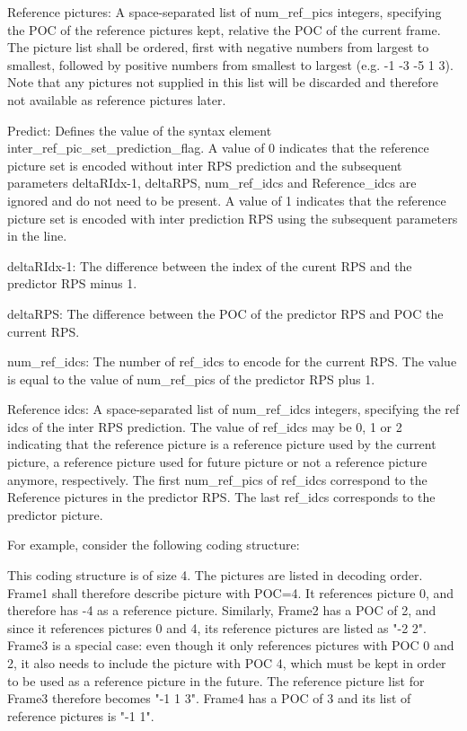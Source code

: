 \documentclass[a4paper,11pt]{jctvcdoc}
\begin{document}
Reference pictures: A space-separated list of num_ref_pics integers,
specifying the POC of the reference pictures kept, relative the
POC of the current frame. The picture list shall be ordered,
first with negative numbers from largest to smallest, followed by
positive numbers from smallest to largest (e.g. -1 -3 -5 1 3).
Note that any pictures not supplied in this list will be
discarded and therefore not available as reference pictures
later.

Predict: Defines the value of the syntax element
inter_ref_pic_set_prediction_flag. A value of 0 indicates that
the reference picture set is encoded without inter RPS prediction
and the subsequent parameters deltaRIdx-1, deltaRPS, num_ref_idcs
and Reference_idcs are ignored and do not need to be present. A
value of 1 indicates that the reference picture set is encoded
with inter prediction RPS using the subsequent parameters in the
line.

deltaRIdx-1: The difference between the index of the curent RPS
and the predictor RPS minus 1.

deltaRPS: The difference between the POC of the predictor RPS and
POC the current RPS.

num_ref_idcs: The number of ref_idcs to encode for the current RPS.
The value is equal to the value of  num_ref_pics of the predictor
RPS plus 1.

Reference idcs: A space-separated list of num_ref_idcs integers,
specifying the ref idcs of the inter RPS prediction. The value of
ref_idcs may be 0, 1 or 2 indicating that the reference picture
is a reference picture used by the current picture, a reference
picture used for future picture or not a reference picture
anymore, respectively. The first num_ref_pics of ref_idcs correspond
to the Reference pictures in the predictor RPS. The last ref_idcs
corresponds to the predictor picture.

For example, consider the following coding structure:

This coding structure is of size 4. The pictures are listed in
decoding order. Frame1 shall therefore describe picture with
POC=4. It references picture 0, and therefore has -4 as a
reference picture. Similarly, Frame2 has a POC of 2, and since it
references pictures 0 and 4, its reference pictures are listed as
"-2 2". Frame3 is a special case: even though it only references
pictures with POC 0 and 2, it also needs to include the picture
with POC 4, which must be kept in order to be used as a reference
picture in the future. The reference picture list for Frame3
therefore becomes "-1 1 3". Frame4 has a POC of 3 and its list of
reference pictures is "-1 1".
\end{document}
